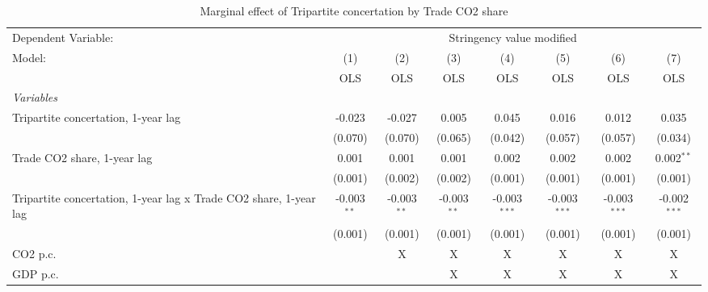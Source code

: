 
\begin{table}[htbp]
   \caption{Marginal effect of Tripartite concertation by Trade CO2 share}
   \centering
   \begin{tabular}{lccccccc}
      \toprule
      Dependent Variable: & \multicolumn{7}{c}{Stringency value modified}\\
      Model:                                                            & (1)           & (2)           & (3)           & (4)            & (5)            & (6)            & (7)\\  
                                                                        &  OLS          & OLS           & OLS           & OLS            & OLS            & OLS            & OLS\\  
      \midrule
      \emph{Variables}\\
      Tripartite concertation, 1-year lag                               & -0.023        & -0.027        & 0.005         & 0.045          & 0.016          & 0.012          & 0.035\\   
                                                                        & (0.070)       & (0.070)       & (0.065)       & (0.042)        & (0.057)        & (0.057)        & (0.034)\\   
      Trade CO2 share, 1-year lag                                       & 0.001         & 0.001         & 0.001         & 0.002          & 0.002          & 0.002          & 0.002$^{**}$\\   
                                                                        & (0.001)       & (0.002)       & (0.002)       & (0.001)        & (0.001)        & (0.001)        & (0.001)\\   
      Tripartite concertation, 1-year lag x Trade CO2 share, 1-year lag & -0.003$^{**}$ & -0.003$^{**}$ & -0.003$^{**}$ & -0.003$^{***}$ & -0.003$^{***}$ & -0.003$^{***}$ & -0.002$^{***}$\\   
                                                                        & (0.001)       & (0.001)       & (0.001)       & (0.001)        & (0.001)        & (0.001)        & (0.001)\\   
      CO2 p.c.                                                          &               & X             & X             & X              & X              & X              & X\\  
      GDP p.c.                                                          &               &               & X             & X              & X              & X              & X\\  

\end{tabular}
\end{table}
